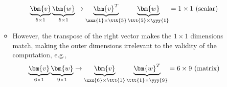 \begin{itemize}
\begin{itemize}
    \[%
    \underbrace{\bm{v}}_{5\times1}\underbrace{\bm{w}}_{5\times1}
    \to
    \underbrace{\bm{v}^T}_{\xxx{1}\times \ttt{5}}\underbrace{\bm{w}}_{\ttt{5}\times\yyy{1}}
    = 1\times 1~\text{(scalar)}
    \]%
    \item However, the transpose of the right vector makes the \(1 \times 1\) dimensions match, making the outer dimensions irrelevant to the validity of the computation, e.g., 
    \[%
    \underbrace{\bm{v}}_{6\times1}\underbrace{\bm{w}}_{9\times1}
    \to
    \underbrace{\bm{v}}_{\xxx{6}\times \ttt{1}}\underbrace{\bm{w}^T}_{\ttt{1}\times\yyy{9}}
    = 6\times 9~\text{(matrix)}
    \]%
  \end{itemize}


\end{itemize}
